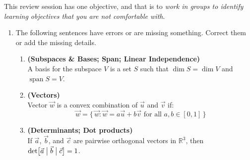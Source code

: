 \documentclass[red]{tutorial}
\newcommand{\R}{\mathbb{R}}
\newcommand{\mute}[1]{}
\DeclareMathOperator{\Span} {span}
\theoremstyle{definition}
\theoremstyle{theorem}
\begin{document}
\begin{tutorial}
  \begin{objectives}
    This review session has one objective, and that is to
    \emph{work in groups to identify learning objectives that you
    are not comfortable with}.
  \end{objectives}
  \begin{enumerate}
    \item \label{q:mistake}
      The following sentences have errors or are missing something. Correct
      them or add the missing details.
      \begin{enumerate}
          \mute{
        \item \textbf{(Linear Transformations)}\\
          A transformation $f\colon\R^n\to \R^m$ is linear if
          it sends sums to sums, $f(\vec0) = \vec0$, and
          $f(\alpha \vec x) = \alpha f(\vec x)$.
        \item
          An $n\times m$ matrix corresponds to a linear
          transformation from $\R^n$
          to $\R^m$.
          }
        \item \textbf{(Subspaces \& Bases; Span; Linear Independence)}\\
          A basis for the subspace $V$ is a set $S$
          such that $\dim S = \dim V$ and $\Span S = V$.
        \item \textbf{(Vectors)}\\
          Vector $\vec w$ is a convex combination of $\vec u$ and $\vec v$ if:
          \begin{equation*}
            \vec w =
            \bigl\{\,\vec w:\vec w = a\vec u %
            +b\vec v \text{ for all } a,b\in [0,1]\,
            \bigr\}
          \end{equation*}
        \item \textbf{(Determinants; Dot products)} \\
          If $\vec a$, $\vec b$, and $\vec c$ are pairwise orthogonal
          vectors in $\R^3$, then
          $\det \bigl[\vec a\bigm|\vec b\bigm|\vec c\bigr] = 1$.

\end{enumerate}
\end{enumerate}
\end{tutorial}
\end{document}
